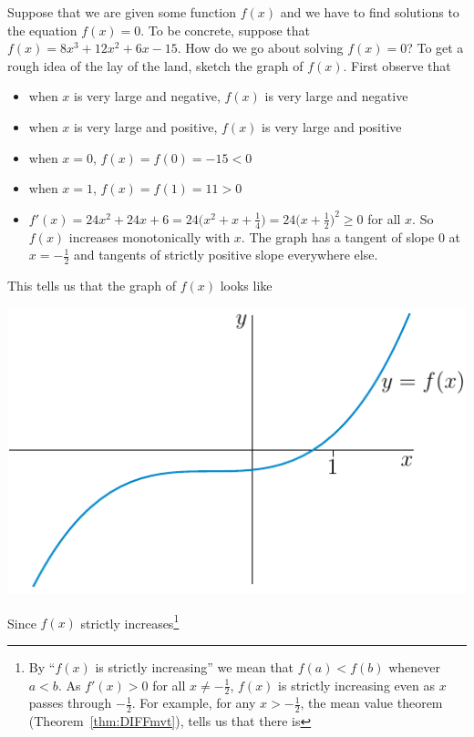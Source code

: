\begin{eg}\label{eg:rootFindingA}
Suppose that we are given some function $f(x)$ and we have to find
solutions to the equation $f(x)=0$. To be concrete, suppose
that $f(x) = 8x^3+12x^2+6x-15$. How do we go about solving
$f(x)=0$? To get a rough idea of the lay of the land, sketch
the graph of $f(x)$. First observe that
\begin{itemize}\itemsep1pt \parskip0pt 
\item when $x$ is very large and negative, $f(x)$ is very large 
and negative
\item when $x$ is very large and positive, $f(x)$ is very large 
and positive 
\item when $x=0$, $f(x) =f(0) = -15<0$
\item when $x=1$, $f(x) =f(1) = 11>0$
\item $f'(x) = 24x^2+24x+6 = 24\big(x^2+x+\frac{1}{4}\big)
          =24\big(x+\frac{1}{2}\big)^2\ge 0$ for all $x$.
      So $f(x)$ increases monotonically with $x$. The graph has
      a tangent of slope $0$ at $x=-\frac{1}{2}$ and tangents of
      strictly positive slope everywhere else.
\end{itemize}
This tells us that the graph of $f(x)$ looks like
\begin{efig}
\begin{center}
   \includegraphics{rootFindingCubic}
\end{center}
\end{efig}
Since $f(x)$ strictly increases\footnote{By ``$f(x)$ is strictly increasing'' 
we mean that $f(a)<f(b)$ whenever $a<b$. 
As $f'(x)>0$ for all $x\ne-\frac{1}{2}$, $f(x)$ is strictly increasing even 
as $x$ passes through $-\frac{1}{2}$. For example, for any $x>-\frac{1}{2}$, 
the mean value theorem (Theorem~\ref{thm:DIFFmvt}), tells us that there is 
}
\end{eg}
